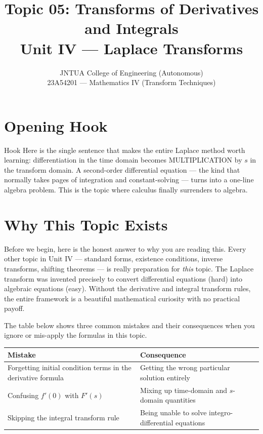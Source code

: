 \documentclass[12pt,a4paper]{article}
\title{Topic 05: Transforms of Derivatives and Integrals \\
       \large Unit IV --- Laplace Transforms}
\author{JNTUA College of Engineering (Autonomous)\\
        23A54201 --- Mathematics IV (Transform Techniques)}
\date{}
\begin{document}
\maketitle
\tableofcontents
\newpage

\section{Opening Hook}

\begin{curiositybox}{Hook}
Here is the single sentence that makes the entire Laplace method worth learning:
differentiation in the time domain becomes MULTIPLICATION by \(s\) in the transform domain.
A second-order differential equation --- the kind that normally takes pages of integration
and constant-solving --- turns into a one-line algebra problem.
This is the topic where calculus finally surrenders to algebra.
\end{curiositybox}

\section{Why This Topic Exists}

Before we begin, here is the honest answer to why you are reading this.
Every other topic in Unit IV --- standard forms, existence conditions, inverse transforms,
shifting theorems --- is really preparation for \emph{this} topic.
The Laplace transform was invented precisely to convert differential equations (hard)
into algebraic equations (easy).
Without the derivative and integral transform rules, the entire framework is a beautiful
mathematical curiosity with no practical payoff.

\medskip
\noindent The table below shows three common mistakes and their consequences when you
ignore or mis-apply the formulas in this topic.

\begin{center}
\begin{tabular}{p{6cm} p{7cm}}
\toprule
\textbf{Mistake} & \textbf{Consequence} \\
\midrule
Forgetting initial condition terms in the derivative formula
  & Getting the wrong particular solution entirely \\[4pt]
Confusing \(f'(0)\) with \(F'(s)\)
  & Mixing up time-domain and \(s\)-domain quantities \\[4pt]
Skipping the integral transform rule
  & Being unable to solve integro-differential equations \\
\bottomrule
\end{tabular}
\end{center}
\end{document}
